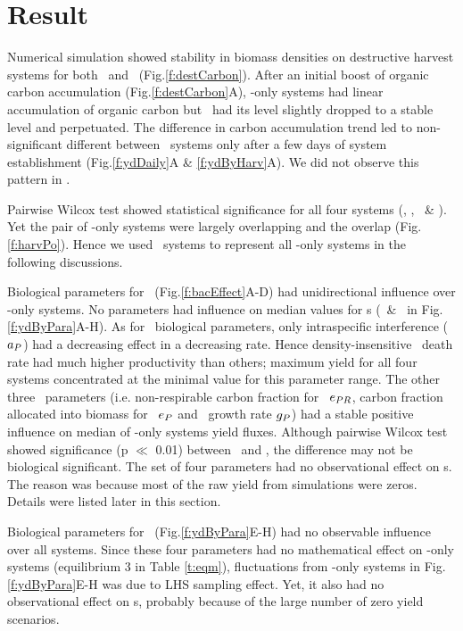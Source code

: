\documentclass[../thesis.tex]{subfiles} %
\begin{document}
\section{Result}
Numerical simulation showed stability in biomass densities on destructive harvest systems for both \PoN\ and \PBN\ (Fig.\ref{f:destCarbon}).  After an initial boost of organic carbon accumulation (Fig.\ref{f:destCarbon}A), \phy-only systems had linear accumulation of organic carbon but \pbs\ had its level slightly dropped to a stable level and perpetuated.  The difference in carbon accumulation trend led to non-significant different between \PoN\ systems only after a few days of system establishment (Fig.\ref{f:ydDaily}A \& \ref{f:ydByHarv}A).  We did not observe this pattern in \pbs.

Pairwise Wilcox test showed statistical significance for all four systems (\PBH, \PoH, \PBN\ \& \PoN).  Yet the pair of \phy-only systems were largely overlapping and the overlap (Fig.\ref{f:harvPo}).  Hence we used \PoN\ systems to represent all \phy-only systems in the following discussions.

Biological parameters for \phy\ (Fig.\ref{f:bacEffect}A-D) had unidirectional influence over \phy-only systems.  No parameters had influence on median values for \pbs s (\PBH\ \& \PBN\ in Fig.\ref{f:ydByPara}A-H).  As for \phy\ biological parameters, only intraspecific interference ($a_P$) had a decreasing effect in a decreasing rate.  Hence density-insensitive \phy\ death rate had much higher productivity than others; maximum yield for all four systems concentrated at the minimal value for this parameter range.  The other three \phy\ parameters (i.e. non-respirable carbon fraction for \phy\ $e_{PR}$, carbon fraction allocated into biomass for \phy\ $e_P$ and \phy\ growth rate $g_P$) had a stable positive influence on median of \phy-only systems yield fluxes.  Although pairwise Wilcox test showed significance (p $\ll$ 0.01) between \PoH\ and \PoN, the difference may not be biological significant.  The set of four parameters had no observational effect on \pbs s.  The reason was because most of the raw yield from simulations were zeros.  Details were listed later in this section.

Biological parameters for \bac\ (Fig.\ref{f:ydByPara}E-H) had no observable influence over all systems.  Since these four parameters had no mathematical effect on \phy-only systems (equilibrium 3 in Table \ref{t:eqm}), fluctuations from \phy-only systems in Fig.\ref{f:ydByPara}E-H was due to LHS sampling effect.  Yet, it also had no observational effect on \pbs s, probably because of the large number of zero yield scenarios.
\end{document}
